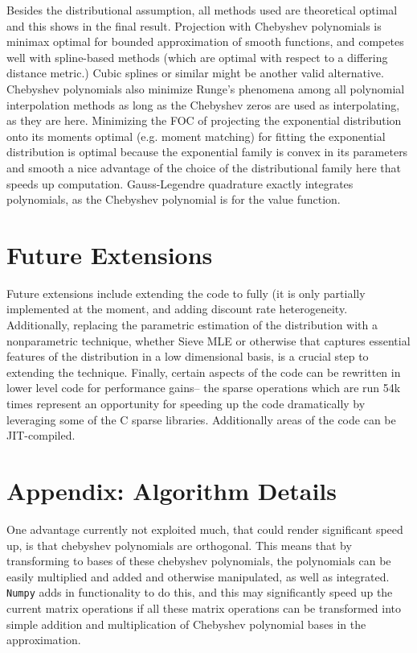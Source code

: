 \documentclass[11pt]{article}
\newcommand{\code}[1]{\texttt{#1}}
\begin{document}
\par Besides the distributional assumption, all methods used are theoretical optimal and this shows in the final result. Projection with Chebyshev polynomials is minimax optimal for bounded approximation of smooth functions, and competes well with spline-based methods (which are optimal with respect to a differing distance metric.) Cubic splines or similar might be another valid alternative.  Chebyshev polynomials also minimize Runge's phenomena among all polynomial interpolation methods as long as the Chebyshev zeros are used as interpolating, as they are here. Minimizing the FOC of projecting the exponential distribution onto its moments optimal (e.g. moment matching) for fitting the exponential distribution is optimal because the exponential family is convex in its parameters and smooth a nice advantage of the choice of the distributional family here that speeds up computation. Gauss-Legendre quadrature exactly integrates polynomials, as the Chebyshev polynomial is for the value function. 
\section{Future Extensions}
Future extensions include extending the code to \cite{Winberry2021} fully (it is only partially implemented at the moment, and adding discount rate heterogeneity. Additionally, replacing the parametric estimation of the distribution with a nonparametric technique, whether Sieve MLE or otherwise that captures essential features of the distribution in a low dimensional basis, is a crucial step to extending the technique. Finally, certain aspects of the code can be rewritten in lower level code for performance gains-- the sparse operations which are run 54k times represent an opportunity for speeding up the code dramatically by leveraging some of the C sparse libraries. Additionally areas of the code can be JIT-compiled. \section{Appendix: Algorithm Details} 
One advantage currently not exploited much, that could render significant speed up, is that chebyshev polynomials are orthogonal. This means that by transforming to bases of these chebyshev polynomials, the polynomials can be easily multiplied and added and otherwise manipulated, as well as integrated. \code{Numpy} adds in functionality to do this, and this may significantly speed up the current matrix operations if all these matrix operations can be transformed into simple addition and multiplication of Chebyshev polynomial bases in the approximation. 
\end{document}
